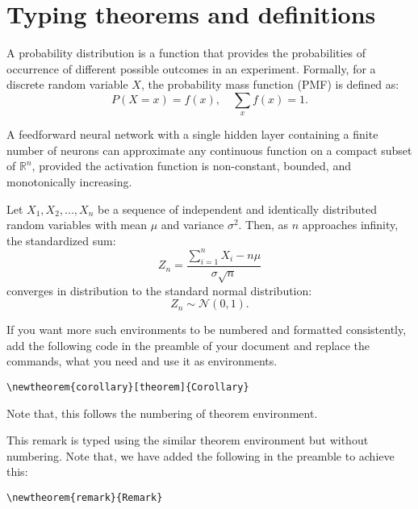 \section{Typing theorems and definitions}
\begin{definition}
	A probability distribution is a function that provides the probabilities of occurrence of different possible outcomes in an experiment. Formally, for a discrete random variable $X$, the probability mass function (PMF) is defined as:
	\begin{equation}
		P(X = x) = f(x), \quad \sum_{x} f(x) = 1.
	\end{equation}
\end{definition}

\begin{lemma}
	A feedforward neural network with a single hidden layer containing a finite number of neurons can approximate any continuous function on a compact subset of $\mathbb{R}^n$, provided the activation function is non-constant, bounded, and monotonically increasing.
\end{lemma}

\begin{theorem}
	Let $X_1, X_2, ..., X_n$ be a sequence of independent and identically distributed random variables with mean $\mu$ and variance $\sigma^2$. Then, as $n$ approaches infinity, the standardized sum:
	\begin{equation}
		Z_n = \frac{\sum_{i=1}^{n} X_i - n\mu}{\sigma\sqrt{n}}
	\end{equation}
	converges in distribution to the standard normal distribution:
	\begin{equation}
		Z_n \sim \mathcal{N}(0,1).
	\end{equation}
\end{theorem}

If you want more such environments to be numbered and formatted consistently, add the following code in the preamble of your document and replace the commands, what you need and use it as environments.

\begin{verbatim}
\newtheorem{corollary}[theorem]{Corollary}
\end{verbatim}
Note that, this follows the numbering of theorem environment. 

\begin{remark}
This remark is typed using the similar theorem environment but without numbering. Note that, we have added the following in the preamble to achieve this:
\begin{verbatim}
\newtheorem{remark}{Remark}
\end{verbatim}
\end{remark}

